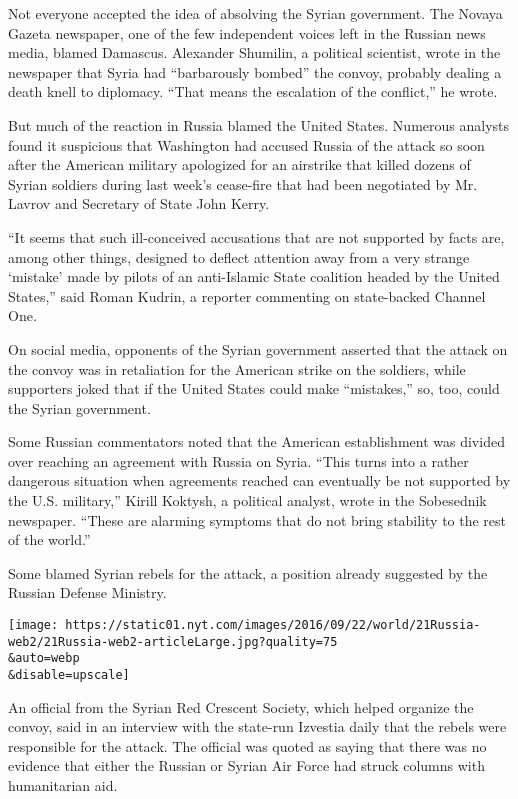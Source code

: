 Not everyone accepted the idea of absolving the Syrian government. The
Novaya Gazeta newspaper, one of the few independent voices left in the
Russian news media, blamed Damascus. Alexander Shumilin, a political
scientist, wrote in the newspaper that Syria had ``barbarously bombed''
the convoy, probably dealing a death knell to diplomacy. ``That means
the escalation of the conflict,'' he wrote.

But much of the reaction in Russia blamed the United States. Numerous
analysts found it suspicious that Washington had accused Russia of the
attack so soon after the American military apologized for an airstrike
that killed dozens of Syrian soldiers during last week's cease-fire that
had been negotiated by Mr. Lavrov and Secretary of State John Kerry.

``It seems that such ill-conceived accusations that are not supported by
facts are, among other things, designed to deflect attention away from a
very strange `mistake' made by pilots of an anti-Islamic State coalition
headed by the United States,'' said Roman Kudrin, a reporter commenting
on state-backed Channel One.

On social media, opponents of the Syrian government asserted that the
attack on the convoy was in retaliation for the American strike on the
soldiers, while supporters joked that if the United States could make
``mistakes,'' so, too, could the Syrian government.

Some Russian commentators noted that the American establishment was
divided over reaching an agreement with Russia on Syria. ``This turns
into a rather dangerous situation when agreements reached can eventually
be not supported by the U.S. military,'' Kirill Koktysh, a political
analyst, wrote in the Sobesednik newspaper. ``These are alarming
symptoms that do not bring stability to the rest of the world.''

Some blamed Syrian rebels for the attack, a position already suggested
by the Russian Defense Ministry.

\texttt{[image: https://static01.nyt.com/images/2016/09/22/world/21Russia-web2/21Russia-web2-articleLarge.jpg?quality=75\\\&auto=webp\\\&disable=upscale]}

An official from the Syrian Red Crescent Society, which helped organize
the convoy, said in an interview with the state-run Izvestia daily that
the rebels were responsible for the attack. The official was quoted as
saying that there was no evidence that either the Russian or Syrian Air
Force had struck columns with humanitarian aid.

